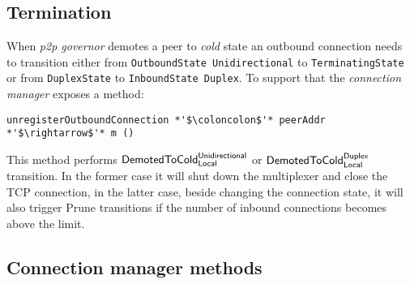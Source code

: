 \documentclass{article}
\def\TCP{\textsf{TCP}}
\def\OutboundStateUni{\texttt{OutboundState Unidirectional}}
\def\DuplexState{\texttt{DuplexState}}
\def\InboundStateDup{\texttt{InboundState Duplex}}
\def\TerminatingState{\texttt{TerminatingState}}
\def\DemotedToColdDupLoc{$\text{\textsf{DemotedToCold}}^\text{\textsf{Duplex}}_\text{\textsf{Local}}$}
\def\DemotedToColdUniLoc{$\text{\textsf{DemotedToCold}}^\text{\textsf{Unidirectional}}_\text{\textsf{Local}}$}
\def\Prune{\textsf{Prune}}
\def\cold{\textit{cold}}
\def\ptopgov{\textit{p2p governor}}
\def\connmngr{\textit{connection manager}}
\begin{document}
\subsection{Termination}\label{sec:outbound_termination}

When \ptopgov{} demotes a peer to \cold{} state an outbound
connection needs to transition either from \OutboundStateUni{} to
\TerminatingState{} or from \DuplexState{} to \InboundStateDup{}.  To
support that the \connmngr{} exposes a method:
\begin{lstlisting}
unregisterOutboundConnection *'$\coloncolon$'* peerAddr *'$\rightarrow$'* m ()
\end{lstlisting}
This method performs \DemotedToColdUniLoc{} or
\DemotedToColdDupLoc{} transition. In the former case it will shut down the
multiplexer and close the \TCP{} connection, in the latter case, beside
changing the connection state, it will also trigger \Prune{} transitions if
the number of inbound connections becomes above the limit.

\subsection{Connection manager methods}
\end{document}
